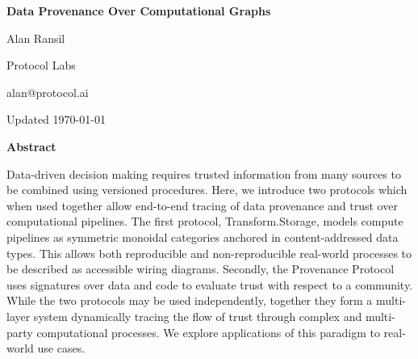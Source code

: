 \documentclass[9pt, oneside]{article}   	%
\begin{document}
\newpage


\begin{center}
\Large{\textbf{Data Provenance Over Computational Graphs}}
\vspace{1 cm}

\normalsize{}
Alan Ransil

Protocol Labs

alan@protocol.ai

\vspace{1 cm}
Updated \today

\vspace{1 cm}
\Large{\textbf{Abstract}}

\end{center}

\noindent Data-driven decision making requires trusted information from many sources to be combined using versioned procedures. Here, we introduce two protocols which when used together allow end-to-end tracing of data provenance and trust over computational pipelines. The first protocol, Transform.Storage, models compute pipelines as symmetric monoidal categories anchored in content-addressed data types. This allows both reproducible and non-reproducible real-world processes to be described as accessible wiring diagrams. Secondly, the Provenance Protocol uses signatures over data and code to evaluate trust with respect to a community.  While the two protocols may be used independently, together they form a multi-layer system dynamically tracing the flow of trust through complex and multi-party computational processes. We explore applications of this paradigm to real-world use cases.
\end{document}
